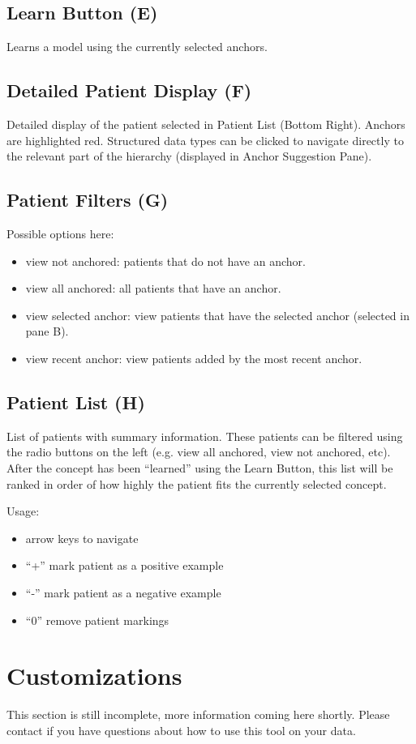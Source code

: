 \documentclass[12pt]{article}
\begin{document}
\subsection{Learn Button (E)}
Learns a model using the currently selected anchors.

\subsection{Detailed Patient Display (F)}
Detailed display of the patient selected in Patient List (Bottom Right). Anchors are highlighted red. Structured data types can be clicked to navigate directly to the relevant part of the hierarchy (displayed in Anchor Suggestion Pane).
\subsection{Patient Filters (G)}
Possible options here:
\begin{itemize}
\item view not anchored: patients that do not have an anchor.
\item view all anchored: all patients that have an anchor.
\item view selected anchor: view patients that have the selected anchor (selected in pane B).
\item view recent anchor: view patients added by the most recent anchor.
\end{itemize}

\subsection{Patient List (H)}
List of patients with summary information. 
These patients can be filtered using the radio buttons on the left (e.g. view all anchored, view not anchored, etc).
After the concept has been ``learned'' using the Learn Button, this list will be ranked in order of how highly the patient fits the currently selected concept.

Usage:
\begin{itemize}
\item arrow keys to navigate
\item ``+'' mark patient as a positive example
\item ``-'' mark patient as a negative example
\item ``0'' remove patient markings
\end{itemize}


\section{Customizations}
This section is still incomplete, more information coming here shortly. Please contact if you have questions about how to use this tool on your data.
\end{document}

